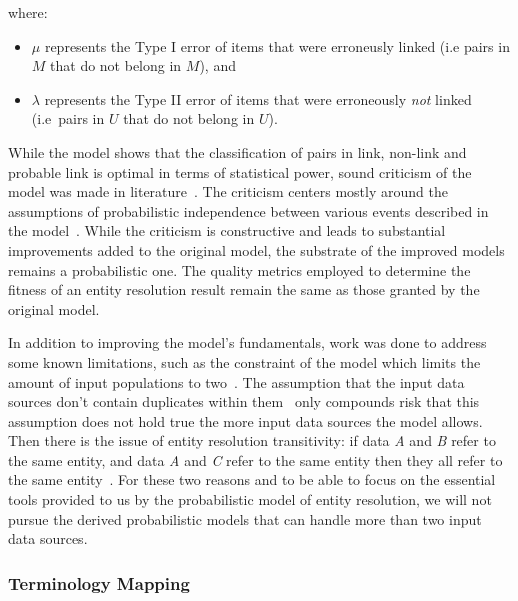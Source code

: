 where:

\begin{itemize}
    \item $\mu$ represents the Type I error of items that were erroneusly
    linked (i.e pairs in $M$ that do not belong in $M$), and
    \item $\lambda$ represents the Type II error of items that were
    erroneously \textit{not} linked (i.e~pairs in $U$ that do not belong in
    $U$).
\end{itemize}

While the model shows that the classification of pairs in link, non-link and
probable link is optimal in terms of statistical power, sound criticism of the
model was made in literature~\cite{tancredi2011fsmcrit}.
The criticism centers mostly around the assumptions of probabilistic
independence between various events described in the model~\cite{winkler2014matching,tancredi2011fsmcrit}.
While the criticism is constructive and leads to substantial improvements added
to the original model, the substrate of the improved models remains a
probabilistic one.
The quality metrics employed to determine the fitness of an entity resolution
result remain the same as those granted by the original model.

In addition to improving the model's fundamentals, work was done to address some
known limitations, such as the constraint of the model which limits the amount
of input populations to two~\cite{sad2013genfsm,Kon19}.
The assumption that the input data sources don't contain duplicates within
them~\cite{fs1969,sad2014fsmdup} only compounds risk that this assumption does
not hold true the more input data sources the model allows.
Then there is the issue of entity resolution transitivity: if data \textit{A}
and \textit{B} refer to the same entity, and data \textit{A} and \textit{C}
refer to the same entity then they all refer to the same entity~\cite{Tal11}.
For these two reasons and to be able to focus on the essential tools provided to
us by the probabilistic model of entity resolution, we will not pursue the
derived probabilistic models that can handle more than two input data sources. 

\subsubsection{Terminology Mapping}\label{F-S Terminology Mapping}

